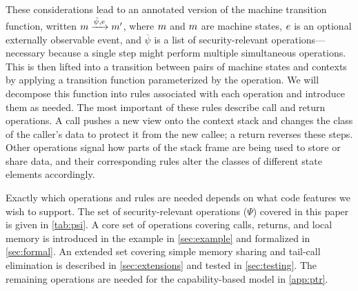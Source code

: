 \documentclass[10pt,conference]{ieeetran}%
\theoremstyle{definition}
\begin{document}
These considerations lead to an annotated version of the
machine transition function, written \(m \xrightarrow{\bar{\psi},
  e} m'\), where \(m\) and \(m\) are machine states, \(e\) is
an optional externally observable event, and \(\overline{\psi}\) is a
list of security-relevant operations---necessary because a single step might
perform multiple simultaneous operations.
%
This is then lifted into a transition between pairs of machine states
and contexts by applying a transition function parameterized by the operation.
We will decompose this function into rules associated with each operation and introduce
them as needed.
%
The most important of these rules describe call and return operations.
A call pushes a new view onto the context stack and changes the class of the
caller's data to protect it from the new callee; a return reverses these steps.
Other operations signal how parts of the stack frame are being used to store
or share data, and their corresponding rules alter the classes of different
state elements accordingly.

Exactly which operations and rules are needed depends on
what code features we wish to support.
The set of security-relevant operations (\(\Psi\)) covered in this paper is given in
\cref{tab:psi}. A core set of operations covering calls, returns, and local
memory is introduced in the example in \cref{sec:example}
and formalized in \cref{sec:formal}. An extended set covering simple memory sharing and
tail-call elimination is described in \cref{sec:extensions} and tested in \cref{sec:testing}.
The remaining operations are needed for the capability-based model in
\cref{app:ptr}.

\newcommand{\example}{\rowcolor{black!0}}
\newcommand{\testing}{\rowcolor{black!10}}
\newcommand{\theory}{\rowcolor{black!25}}
\end{document}
